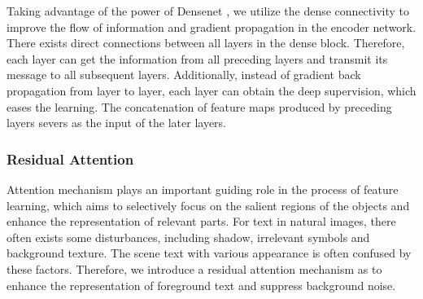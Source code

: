 \documentclass[letterpaper]{article} %
\begin{document}
Taking advantage of the power of Densenet \cite{huang2016densely}, we utilize the dense connectivity to improve the flow of information and gradient propagation in the encoder network. There exists direct connections between all layers in the dense block. Therefore, each layer can get the information from all preceding layers and transmit its message to all subsequent layers. Additionally, instead of gradient back propagation from layer to layer, each layer can obtain the deep supervision, which eases the learning. The concatenation of feature maps produced by preceding layers severs as the input of the later layers.

\subsubsection{Residual Attention}
Attention mechanism plays an important guiding role in the process of feature learning, which aims to selectively focus on the salient regions of the objects and enhance the representation of relevant parts. For text in natural images, there often exists some disturbances, including shadow, irrelevant symbols and background texture. The scene text with various appearance is often confused by these factors. Therefore, we introduce a residual attention mechanism as \cite{wang2017residual} to enhance the representation of foreground text and suppress background noise. \par
\end{document}

